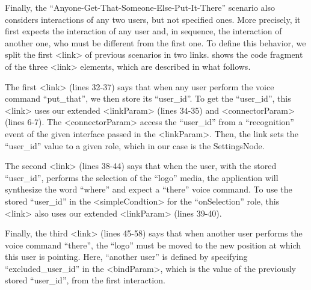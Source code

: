 \documentclass[
  doutorado,
  american
]{ThesisPUC}
\begin{document}
Finally, the “Anyone-Get-That-Someone-Else-Put-It-There” scenario also considers
interactions of any two users, but not specified ones. More precisely, it first
expects the interaction of any user and, in sequence, the interaction of another
one, who must be different from the first one. To define this behavior, we split
the first <link> of previous scenarios in two links. \label{list:annexb7} shows
the code fragment of the three <link> elements, which are described in what
follows. 

The first <link> (lines 32-37) says that when any user perform the voice command
“put\_that”, we then store its “user\_id”. To get the “user\_id”, this <link>
uses our extended <linkParam> (lines 34-35) and <connectorParam> (lines 6-7).
The <connectorParam> access the “user\_id” from a “recognition” event of the
given interface passed in the <linkParam>. Then, the link sets the “user\_id”
value to a given role, which in our case is the SettingsNode.

The second <link> (lines 38-44) says that when the user, with the stored
“user\_id”, performs the selection of the “logo” media, the application will
synthesize the word “where” and expect a “there” voice command. To use the
stored “user\_id” in the <simpleCondtion> for the “onSelection” role, this
<link> also uses our extended <linkParam> (lines 39-40). 

Finally, the third <link> (lines 45-58) says that when another user performs the
voice command “there”, the “logo” must be moved to the new position at which
this user is pointing. Here, “another user” is defined by specifying
“excluded\_user\_id” in the <bindParam>, which is the value of the previously
stored “user\_id”, from the first interaction.
\end{document}
